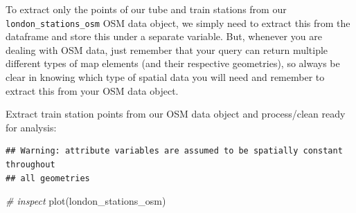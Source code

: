 \documentclass[
]{book}
\newenvironment{Shaded}{\begin{snugshade}}{\end{snugshade}}
\newcommand{\CommentTok}[1]{\textcolor[rgb]{0.56,0.35,0.01}{\textit{#1}}}
\newcommand{\DecValTok}[1]{\textcolor[rgb]{0.00,0.00,0.81}{#1}}
\newcommand{\FunctionTok}[1]{\textcolor[rgb]{0.00,0.00,0.00}{#1}}
\newcommand{\NormalTok}[1]{#1}
\newcommand{\OtherTok}[1]{\textcolor[rgb]{0.56,0.35,0.01}{#1}}
\newcommand{\SpecialCharTok}[1]{\textcolor[rgb]{0.00,0.00,0.00}{#1}}
\newcommand{\StringTok}[1]{\textcolor[rgb]{0.31,0.60,0.02}{#1}}
\begin{document}
To extract only the points of our tube and train stations from our \texttt{london\_stations\_osm} OSM data object, we simply need to extract this from the dataframe and store this under a separate variable. But, whenever you are dealing with OSM data, just remember that your query can return multiple different types of map elements (and their respective geometries), so always be clear in knowing which type of spatial data you will need and remember to extract this from your OSM data object.

Extract train station points from our OSM data object and process/clean ready for analysis:

\begin{Shaded}
\end{Shaded}

\begin{verbatim}
## Warning: attribute variables are assumed to be spatially constant throughout
## all geometries
\end{verbatim}

\begin{Shaded}
\begin{Highlighting}[]
\CommentTok{\# inspect}
\FunctionTok{plot}\NormalTok{(london\_stations\_osm)}
\end{Highlighting}
\end{Shaded}
\end{document}
